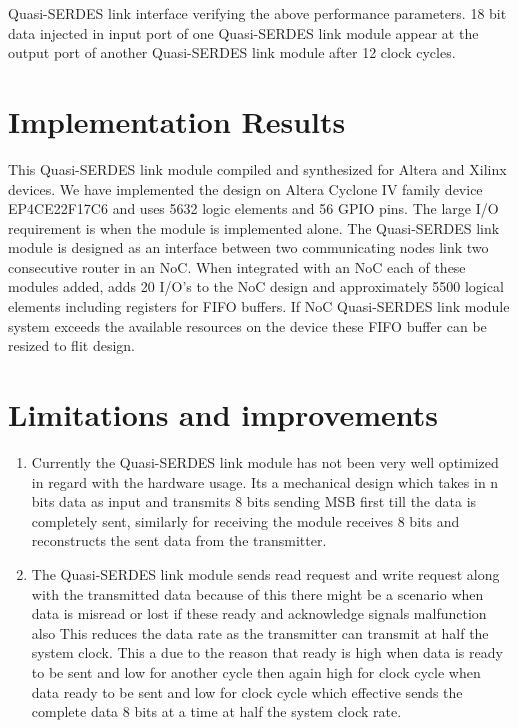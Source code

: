 Quasi-SERDES link interface verifying the above performance parameters. 18 bit data injected in input port of one Quasi-SERDES link module appear at the output port of another Quasi-SERDES link module after 12 clock cycles. 

\section{Implementation Results}

This Quasi-SERDES link module compiled and synthesized for Altera and Xilinx devices. We have implemented the design on Altera Cyclone IV family device EP4CE22F17C6 \cite{DENanoManual} and uses 5632 logic elements and 56 GPIO pins. The large I/O requirement is when the module is implemented alone. The Quasi-SERDES link module is designed as an interface between two communicating nodes link two consecutive router in an NoC. When integrated with an NoC each of these modules added, adds 20 I/O's to the NoC design and approximately 5500 logical elements including registers for FIFO buffers. If NoC Quasi-SERDES link module system exceeds the available resources on the device these FIFO buffer can be resized to flit design.

\section{Limitations and improvements}
\begin{enumerate}
\item{Currently the Quasi-SERDES link module has not been very well optimized in regard with the hardware usage. Its a mechanical design which takes in n bits data as input and transmits 8 bits sending MSB first till the data is completely sent, similarly for receiving the module receives 8 bits and reconstructs the sent data from the transmitter.}
\item{The Quasi-SERDES link module sends read request and write request along with the transmitted data because of this there might be a scenario when data is misread or lost if these ready and acknowledge signals malfunction also This reduces the data rate as the transmitter can transmit at half the system clock. This a due to the reason that ready is high when data is ready to be sent and low for another cycle then again high for clock cycle when data ready to be sent and low for clock cycle which effective sends the complete data 8 bits at a time at half the system clock rate.} 
\end{enumerate}